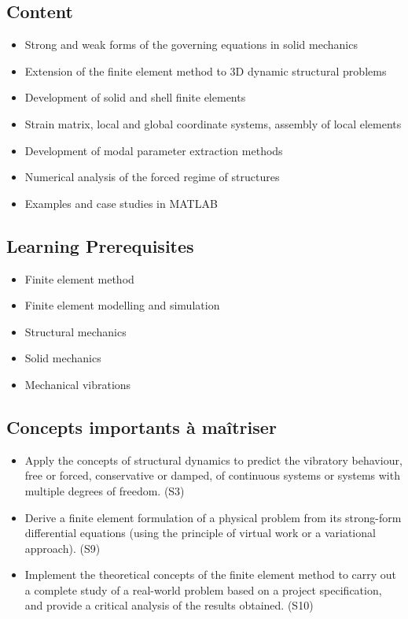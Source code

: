 \documentclass[11pt]{amsart}
\begin{document}
\subsection*{Content}
\begin{itemize}
\item Strong and weak forms of the governing equations in solid mechanics 
\item Extension of the finite element method to 3D dynamic structural problems
\item Development of solid and shell finite elements
\item  Strain matrix, local and global coordinate systems, assembly of local elements 
\item Development of modal parameter extraction methods
\item Numerical analysis of the forced regime of structures
\item Examples and case studies in MATLAB
\end{itemize}


\subsection*{Learning Prerequisites}
\begin{itemize}
\item Finite element method
\item Finite element modelling and simulation
\item Structural mechanics
\item Solid mechanics
\item Mechanical vibrations
\end{itemize}

\subsection*{Concepts importants à maîtriser}
\begin{itemize}
\item Apply the concepts of structural dynamics to predict the vibratory behaviour, free or forced, conservative or damped, of continuous systems or systems with multiple degrees of freedom. (S3)
\item Derive a finite element formulation of a physical problem from its strong-form differential equations (using the principle of virtual work or a variational approach). (S9)
\item Implement the theoretical concepts of the finite element method to carry out a complete study of a real-world problem based on a project specification, and provide a critical analysis of the results obtained. (S10)
\end{itemize}
\end{document}
